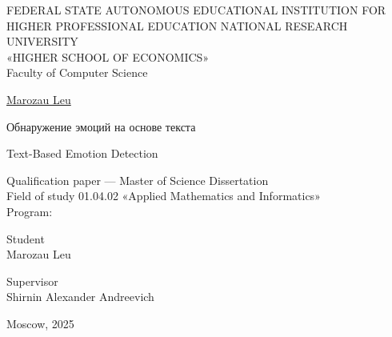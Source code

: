\begin{titlepage}
\newpage

\begin{center}
FEDERAL STATE AUTONOMOUS EDUCATIONAL INSTITUTION FOR\\
HIGHER PROFESSIONAL EDUCATION NATIONAL RESEARCH\\
UNIVERSITY\\
«HIGHER SCHOOL OF ECONOMICS»\\
\bigskip
Faculty of Computer Science
\end{center}

\vspace{2em}

\begin{center}
\underline{Marozau Leu}
\end{center}

\vspace{2em}

\begin{center}
Обнаружение эмоций на основе текста
\end{center}

\vspace{2em}

\begin{center}
Text-Based Emotion Detection
\end{center}

\vspace{4em}

\begin{center}
Qualification paper — Master of Science Dissertation\\
Field of study 01.04.02 «Applied Mathematics and Informatics»\\
Program: 
\end{center}

\vspace{6em}

\begin{flushleft}
Student\\
Marozau Leu
\end{flushleft}

\vspace{4em}

\begin{flushright}
Supervisor\\
Shirnin Alexander Andreevich
\end{flushright}

\vspace{\fill}

\begin{center}
Moscow, 2025
\end{center}

\end{titlepage}

